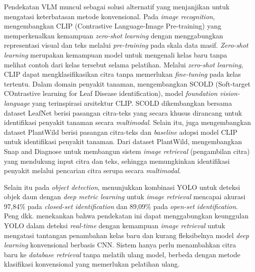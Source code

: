 Pendekatan VLM muncul sebagai solusi alternatif yang menjanjikan untuk mengatasi keterbatasan metode konvensional. Pada \textit{image recognition}, \textcite{radfordLearningTransferableVisual2021} mengembangkan CLIP (Contrastive Language-Image Pre-training) yang memperkenalkan kemampuan \textit{zero-shot learning} dengan menggabungkan representasi visual dan teks melalui \textit{pre-training} pada skala data masif. \textit{Zero-shot learning} merupakan kemampuan model untuk mengenali kelas baru tanpa melihat contoh dari kelas tersebut selama pelatihan. Melalui \textit{zero-shot learning}, CLIP dapat mengklasifikasikan citra tanpa memerlukan \textit{fine-tuning} pada kelas tertentu. Dalam domain penyakit tanaman, \textcite{quocVisionLanguageFoundationModel2025} mengembangkan SCOLD (Soft-target COntrastive learning for Leaf Disease identification), model \textit{foundation vision-language} yang terinspirasi arsitektur CLIP. SCOLD dikembangkan bersama dataset LeafNet berisi pasangan citra-teks yang secara khusus dirancang untuk identifikasi penyakit tanaman secara \textit{multimodal}. Selain itu, \textcite{weiBenchmarkingInthewildMultimodal2024} juga mengembangkan dataset PlantWild berisi pasangan citra-teks dan \textit{baseline} adopsi model CLIP untuk identifikasi penyakit tanaman. Dari dataset PlantWild, \textcite{weiSnapDiagnoseAdvanced2024} mengembangkan Snap and Diagnose untuk membangun sistem \textit{image retrieval} (pengambilan citra) yang mendukung input citra dan teks, sehingga memungkinkan identifikasi penyakit melalui pencarian citra serupa secara \textit{multimodal}.

Selain itu pada \textit{object detection}, \textcite{pengLeafDiseaseImage2022} menunjukkan kombinasi YOLO untuk deteksi objek daun dengan \textit{deep metric learning} untuk \textit{image retrieval} mencapai akurasi 97,84\% pada \textit{closed-set identification} dan 89,09\% pada \textit{open-set identification}. Peng dkk. menekankan bahwa pendekatan ini dapat menggabungkan keunggulan YOLO dalam deteksi \textit{real-time} dengan kemampuan \textit{image retrieval} untuk mengatasi tantangan penambahan kelas baru dan kurang fleksibelnya model \textit{deep learning} konvensional berbasis CNN. Sistem hanya perlu menambahkan citra baru ke \textit{database retrieval} tanpa melatih ulang model, berbeda dengan metode klasifikasi konvensional yang memerlukan pelatihan ulang.

